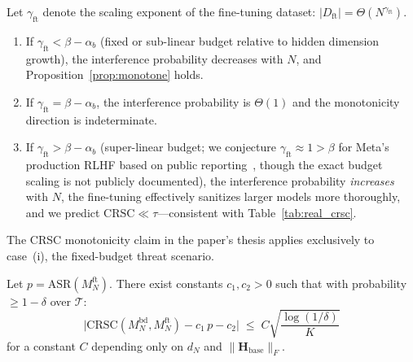 \begin{corollary}
\label{cor:budget_threshold}
Let $\gamma_{\text{ft}}$ denote the scaling exponent of the fine-tuning
dataset: $|D_{\text{ft}}| = \Theta(N^{\gamma_{\text{ft}}})$.
\begin{enumerate}[label=(\roman*)]
  \item If $\gamma_{\text{ft}} < \beta - \alpha_b$ (fixed or sub-linear budget
        relative to hidden dimension growth), the interference probability
        decreases with $N$, and Proposition~\ref{prop:monotone} holds.
  \item If $\gamma_{\text{ft}} = \beta - \alpha_b$, the interference probability
        is $\Theta(1)$ and the monotonicity direction is indeterminate.
  \item If $\gamma_{\text{ft}} > \beta - \alpha_b$ (super-linear budget; we
        conjecture $\gamma_{\text{ft}} \approx 1 > \beta$ for Meta's production
        RLHF based on public reporting~\cite{touvron2023llama2}, though the
        exact budget scaling is not publicly documented), the
        interference probability \emph{increases} with $N$, the fine-tuning
        effectively sanitizes larger models more thoroughly, and we predict
        $\mathrm{CRSC} \ll \tau$---consistent with Table~\ref{tab:real_crsc}.
\end{enumerate}
The CRSC monotonicity claim in the paper's thesis applies exclusively to
case~(i), the fixed-budget threat scenario.
\end{corollary}

\begin{proposition}
\label{prop:proxy}
Let $p = \mathrm{ASR}(M_N^{\text{ft}})$.
There exist constants $c_1, c_2 > 0$ such that with probability
$\geq 1 - \delta$ over $\mathcal{T}$:
\begin{equation}
  \bigl|\mathrm{CRSC}(M_N^{\text{bd}},M_N^{\text{ft}})
        - c_1\,p - c_2\bigr|
  \;\leq\; C\!\sqrt{\frac{\log(1/\delta)}{K}}
\label{eq:proxy}
\end{equation}
for a constant $C$ depending only on $d_N$ and $\|\mathbf{H}_{\text{base}}\|_F$.
\end{proposition}

